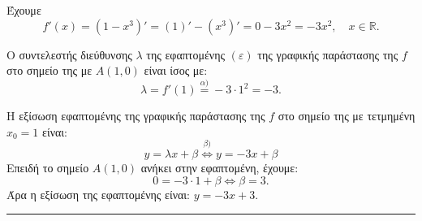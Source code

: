 \begin{alist}
\item Έχουμε
\[
f'(x)=(1-x^3)'=(1)'-(x^3)'=0-3x^2=-3x^2, \quad x \in \mathbb{R}.
\]
\item Ο συντελεστής διεύθυνσης $\lambda$ της εφαπτομένης $(\varepsilon)$ της γραφικής παράστασης της $f$ στο σημείο της με $A(1,0)$ είναι ίσος με:
\[
\lambda = f'(1) \stackrel{\alpha)}{=} -3 \cdot 1^2 = -3.
\]
\item Η εξίσωση εφαπτομένης της γραφικής παράστασης της $f$ στο σημείο της με τετμημένη $x_0=1$ είναι:
\[
y = \lambda x + \beta \stackrel{\beta)}{\iff} y = -3x + \beta
\]
Επειδή το σημείο $A(1,0)$ ανήκει στην εφαπτομένη, έχουμε:
\[
0 = -3 \cdot 1 + \beta \iff \beta = 3.
\]
Άρα η εξίσωση της εφαπτομένης είναι: $y = -3x+3$.
\end{alist}
\vspace{6mm}
\noindent\rule{\textwidth}{0.4pt}
\vspace{6mm}


